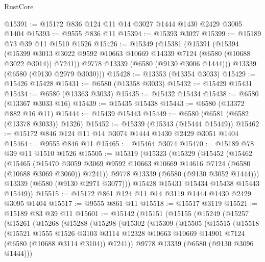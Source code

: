 \begin{lexlean}{RustCore}
\begin{coremodule}
@15391 := @15172 @836 @124 @11 @14 @3027 @1444 @1430 @2429 @3005 @1404
@15393 := @9555 @836 @11
@15394 := @15393 @3027
@15399 := @15189 @73 @39 @11 @1510 @1526
@15426 := @15349
    (@15381
      (@15391
        (@15394
          (@15399 @3013 @3022 @9592 @10663 @10669 @14339 @7124 (@6580 (@10688 @3022 @3014)) @7241))
        @9778
        @13339
        (@6580 (@9130 @3006 @1444)))
      @13339
      (@6580 (@9130 @2979 @3030)))
@15428 := @13353 (@13354 @3033)
@15429 := @15426 @15428
@15431 := @6580 (@13358 @3033)
@15432 := @15429 @15431
@15434 := @6580 (@13363 @3033)
@15435 := @15432 @15434
@15438 := @6580 (@13367 @3033 @16)
@15439 := @15435 @15438
@15443 := @6580 (@13372 @882 @16 @11)
@15444 := @15439 @15443
@15449 := @6580 (@6581 (@6582 (@13378 @3033)) @1326)
@15452 := @15339 (@15343 (@15444 @15449))
@15462 := @15172 @846 @124 @11 @14 @3074 @1444 @1430 @2429 @3051 @1404
@15464 := @9555 @846 @11
@15465 := @15464 @3074
@15470 := @15189 @78 @39 @11 @1510 @1526
@15505 := @15319
    (@15323
      (@15329
        (@15452
          (@15462
            (@15465
              (@15470
                @3059
                @3069
                @9592
                @10663
                @10669
                @14616
                @7124
                (@6580 (@10688 @3069 @3060))
                @7241))
            @9778
            @13339
            (@6580 (@9130 @3052 @1444)))
          @13339
          (@6580 (@9130 @2971 @3077)))
        @15428
        @15431
        @15434
        @15438
        @15443
        @15449))
@15515 := @15172 @861 @124 @11 @14 @3119 @1444 @1430 @2429 @3095 @1404
@15517 := @9555 @861 @11
@15518 := @15517 @3119
@15521 := @15189 @83 @39 @11
@15601 := @15142
    (@15151
      (@15155
        (@15249
          (@15257
            (@15261
              (@15268
                (@15288
                  (@15298
                    (@15302
                      (@15309
                        (@15505
                          (@15515
                            (@15518
                              (@15521
                                @1555
                                @1526
                                @3103
                                @3114
                                @12328
                                @10663
                                @10669
                                @14901
                                @7124
                                (@6580 (@10688 @3114 @3104))
                                @7241))
                            @9778
                            @13339
                            (@6580 (@9130 @3096 @1444)))

\end{coremodule}
\end{lexlean}

